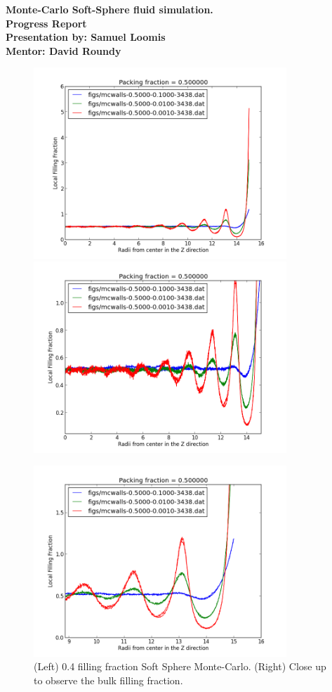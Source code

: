 \documentclass[a4paper,12pt]{article}
\begin{document}
\begin{landscape}
  \begin{center}
    \Huge{\textbf{Monte-Carlo Soft-Sphere fluid simulation.}}\\
    \small{\textbf{Progress Report}}\\
    \Large{\textbf{Presentation by: Samuel Loomis}}\\
    \Large{\textbf{Mentor: David Roundy}}\\
      
  \end{center}
  \newpage
  \begin{figure}[h]
    \centering
    \includegraphics[width=3.75in]{full_50.png}
    \includegraphics[width=3.75in]{bulk_50.png}
    \caption{(Left) 0.4 filling fraction Soft Sphere Monte-Carlo. (Right) Close up to observe the bulk filling fraction.}
    \includegraphics[width=3.75in]{wall_oscillation.png}

\end{figure}
\end{landscape}
\end{document}
